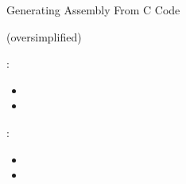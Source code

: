 \begin{frame}{Generating Assembly From C Code}
  \begin{minipage}{.55\linewidth}
      \begin{block}{ {\scriptsize (oversimplified)}}
      \end{block}    
  \end{minipage}\qquad
  \begin{minipage}{.37\linewidth}
      :
      \begin{itemize}
      \item[] 
      \item[] 
      \end{itemize}
      \vspace{2em}
      :
      \begin{itemize}
      \item[] 
      \item[] 
      \end{itemize}
  \end{minipage}
\end{frame}

